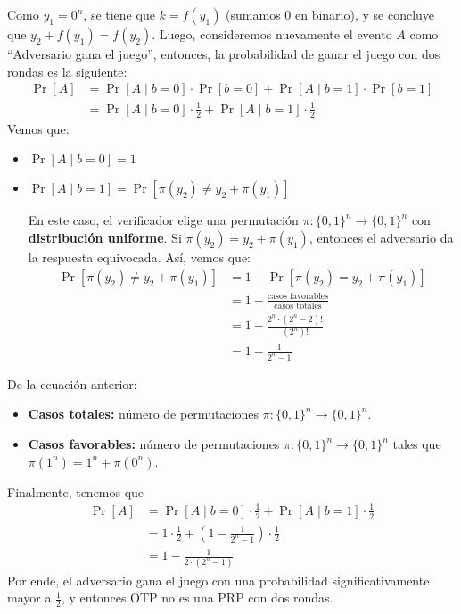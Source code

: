 Como $y_1 = 0^n$, se tiene que $k = f(y_1)$ (sumamos 0 en binario), y se concluye que $y_2 + f(y_1) = f(y_2)$. Luego, consideremos nuevamente el evento $A$ como ``Adversario gana el juego'', entonces, la probabilidad de ganar el juego con dos rondas es la siguiente:
\begin{align*}
    \Pr[A] & = \Pr[A \mid b = 0] \cdot \Pr[b = 0] + \Pr[A \mid b = 1] \cdot \Pr[b = 1]   \\
           & = \Pr[A \mid b = 0] \cdot \frac{1}{2} + \Pr[A \mid b = 1] \cdot \frac{1}{2}
\end{align*}
Vemos que:
\begin{itemize}
    \item $\Pr[A \mid b = 0] = 1$
    \item $\Pr[A \mid b = 1] = \Pr[\pi(y_2) \neq y_2 + \pi(y_1)]$

          En este caso, el verificador elige una permutación $\pi:\{0,1\}^n \to \{0,1\}^n$ con \textbf{distribución uniforme}. Si $\pi(y_2) = y_2 + \pi(y_1)$, entonces el adversario da la respuesta equivocada. Así, vemos que:
          \begin{align*}
              \Pr[\pi(y_2) \neq y_2 + \pi(y_1)] & = 1 - \Pr[\pi(y_2) = y_2 + \pi(y_1)]                       \\
                                                & = 1 - \frac{\text{casos favorables}}{\text{casos totales}} \\
                                                & = 1 - \frac{2^n \cdot (2^n - 2)!}{(2^n)!}                  \\
                                                & = 1 - \frac{1}{2^n - 1}
          \end{align*}
\end{itemize}
De la ecuación anterior:
\begin{itemize}
    \item \textbf{Casos totales:} número de permutaciones $\pi:\{0,1\}^n\to\{0,1\}^n$.
    \item \textbf{Casos favorables:} número de permutaciones $\pi:\{0,1\}^n\to\{0,1\}^n$ tales que $\pi(1^n) = 1^n + \pi(0^n)$.
\end{itemize}
Finalmente, tenemos que
\begin{align*}
    \Pr[A] & = \Pr[A \mid b = 0] \cdot \frac{1}{2} + \Pr[A \mid b = 1] \cdot \frac{1}{2}  \\
           & = 1 \cdot \frac{1}{2} + \left(1 - \frac{1}{2^n - 1}\right) \cdot \frac{1}{2} \\
           & = 1 - \frac{1}{2 \cdot (2^n - 1)}
\end{align*}
Por ende, el adversario gana el juego con una probabilidad significativamente mayor a $\frac{1}{2}$, y entonces OTP no es una PRP con dos rondas.
